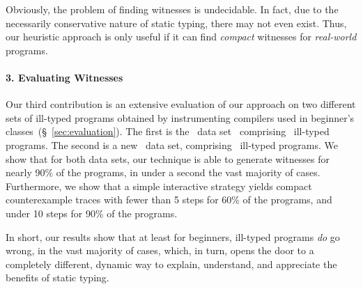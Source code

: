 
Obviously, the problem of finding witnesses is undecidable.
In fact, due to the necessarily conservative nature of static
typing, there may not even exist. Thus, our heuristic approach
is only useful if it can find \emph{compact} witnesses for
\emph{real-world} programs.

\paragraph{3. Evaluating Witnesses}
%
Our third contribution is an extensive evaluation of our approach
on two different sets of ill-typed programs obtained by instrumenting
compilers used in beginner's classes~(\S~\ref{sec:evaluation}).
%
The first is the \uwbench\ data set~\cite{lerner_searching_2007}
comprising \uwsize\ ill-typed programs.
%
The second is a new \ucsdbench\ data set, comprising \ucsdsize\
ill-typed programs.
%
We show that for both data sets, our technique is able to generate
witnesses for nearly 90\% of the programs, in under a second the
vast majority of cases.
%
Furthermore, we show that a simple interactive strategy yields
compact counterexample traces with fewer than 5 steps for 60\%
of the programs, and under 10 steps for 90\% of the programs.

\smallskip
In short, our results show that at least for beginners, ill-typed
programs \emph{do} go wrong, in the vast majority of cases, which,
in turn, opens the door to a completely different, dynamic way
to explain, understand, and appreciate the benefits of static typing.



%


